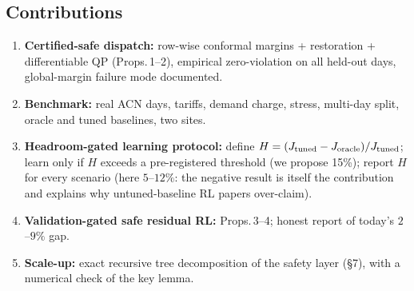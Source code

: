 \documentclass[10pt,a4paper]{article}
\begin{document}
\subsection*{Contributions}
\begin{enumerate}[label=\textbf{C\arabic*.}]
\item \textbf{Certified-safe dispatch:} row-wise conformal margins + restoration + differentiable QP (Props.\,1--2), empirical
zero-violation on all held-out days, global-margin failure mode documented.
\item \textbf{Benchmark:} real ACN days, tariffs, demand charge, stress, multi-day split, oracle and tuned baselines, two sites.
\item \textbf{Headroom-gated learning protocol:} define $H=(J_{\rm tuned}-J_{\rm oracle})/J_{\rm tuned}$; learn only if $H$ exceeds a
pre-registered threshold (we propose 15\%); report $H$ for every scenario (here $5$--$12\%$: the negative result is itself the contribution
and explains why untuned-baseline RL papers over-claim).
\item \textbf{Validation-gated safe residual RL:} Props.\,3--4; honest report of today's $2$--$9\%$ gap.
\item \textbf{Scale-up:} exact recursive tree decomposition of the safety layer (\S7), with a numerical check of the key lemma.
\end{enumerate}
\end{document}
